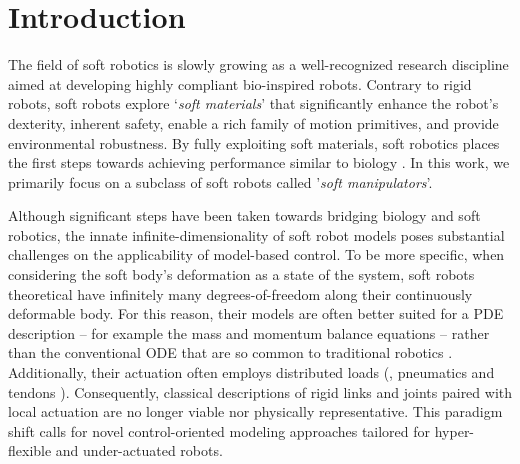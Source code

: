 \section{Introduction} \label{sec:chap3_introduction}
The field of soft robotics is slowly growing as a \editl well-recognized research discipline aimed at developing highly compliant bio-inspired robots\editr. Contrary to rigid robots, soft robots explore `\textit{soft materials}' that significantly enhance the robot's dexterity, inherent safety, enable a rich family of motion primitives, and provide environmental robustness. By fully exploiting soft materials, soft robotics places the first steps towards achieving performance similar to biology \cite{Choi2011,Falkenhahn2015,Marchese2014}. In this work, we primarily focus on a subclass of soft robots called '\textit{soft manipulators}'.

Although significant steps have been taken towards bridging biology and soft robotics, \editl the innate infinite-dimensionality of soft robot models poses substantial challenges on the applicability of model-based control. To be more specific, when considering the soft body's deformation as a state of the system, soft robots theoretical have infinitely many degrees-of-freedom along their continuously deformable body. For this reason, their models are often better suited for a PDE description \cite{Duriez2013,Largilliere2015,Wu2021} -- for example the mass and momentum balance equations -- rather than the conventional ODE that are so common to traditional robotics \cite{Spong2006,Murray1994} \editr. Additionally, their actuation often employs distributed loads (\eg, pneumatics \cite{Falkenhahn2015,Marchese2014} and tendons \cite{Till2019,Wu2021}). Consequently, classical descriptions of rigid links and joints paired with local actuation are no longer viable nor physically representative. This paradigm shift calls for novel control-oriented modeling approaches tailored for hyper-flexible and under-actuated robots.

